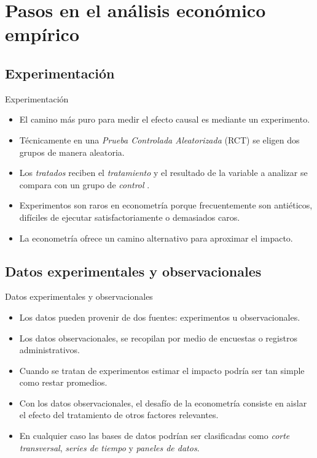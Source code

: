\section{Pasos en el análisis económico empírico}

\subsection{Experimentación}
\begin{frame}{Experimentación}
	\begin{itemize}[<+>]
		\item El camino más puro para medir el efecto causal es mediante un experimento.
		\item Técnicamente en una \textit{Prueba Controlada Aleatorizada} (RCT) se eligen dos grupos de manera aleatoria.
		\item Los \textit{tratados} reciben el \textit{tratamiento} y el resultado de la variable a analizar se compara con un grupo de \textit{control} .
		\item Experimentos son raros en econometría porque frecuentemente son antiéticos, difíciles de ejecutar satisfactoriamente o demasiados caros.
		\item La econometría ofrece un camino alternativo para aproximar el impacto.
	\end{itemize}
\end{frame}

\subsection{Datos experimentales y observacionales}
\begin{frame}{Datos experimentales y observacionales}
	\begin{itemize}[<+>]
		\item Los datos pueden provenir de dos fuentes: experimentos u observacionales.
		\item Los datos observacionales, se recopilan por medio de encuestas o registros administrativos.
		\item Cuando se tratan de experimentos estimar el impacto podría ser tan simple como restar promedios.
		\item Con los datos observacionales, el desafío de la econometría consiste en aislar el efecto del tratamiento de otros factores relevantes.
		\item En cualquier caso las bases de datos podrían ser clasificadas como \textit{corte transversal}, \textit{series de tiempo} y \textit{paneles de datos}.
	\end{itemize}
\end{frame}
